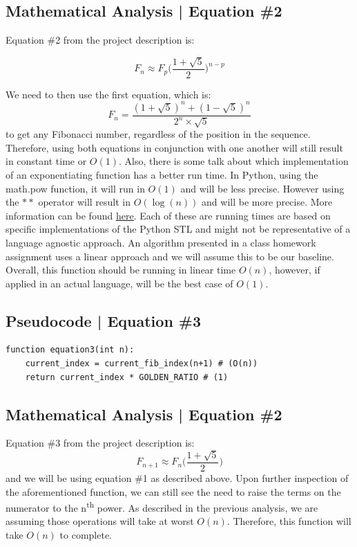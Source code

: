 \documentclass{article}
\begin{document}
\subsection{Mathematical Analysis | Equation \#2}
\begin{flushleft}
Equation \#2 from the project description is:

$$F_{n} \approx F_{p}\bigg(\frac{1 + \sqrt{5}}{2}\bigg)^{n - p}$$

We need to then use the first equation, which is:
$$ F_{n} = \frac{(1 + \sqrt{5})^{n} + (1 - \sqrt{5})^{n}}{2^{n} \times \sqrt{5}}$$
to get any Fibonacci number, regardless of the position in the sequence.
Therefore, using both equations in conjunction with one another will still result in constant time or $O(1)$.
Also, there is some talk about which implementation of an exponentiating function has a better run time.
In Python, using the math.pow function, it will run in $O(1)$ and will be less precise.
However using the $**$ operator will result in $O(\log(n))$ and will be more precise.
More information can be found \href{https://stackoverflow.com/questions/48839772/why-is-time-complexity-o1-for-powx-y-while-it-is-on-for-xy}{\underline{here}}.
Each of these are running times are based on specific implementations of the Python STL and might not be representative of a language agnostic approach.
An algorithm presented in a class homework assignment uses a linear approach and we will assume this to be our baseline.
Overall, this function should be running in linear time $O(n)$, however, if applied in an actual language, will be the best case of $O(1)$.
\end{flushleft}

\newpage

\subsection{Pseudocode | Equation \#3}

\begin{verbatim}
function equation3(int n):
    current_index = current_fib_index(n+1) # (O(n))
    return current_index * GOLDEN_RATIO # (1)

\end{verbatim}

\subsection{Mathematical Analysis | Equation \#2}
\begin{flushleft}
Equation \#3 from the project description is:
$$F_{n+1} \approx F_{n}\bigg(\frac{1 + \sqrt{5}}{2}\bigg)$$
and we will be using equation \#1 as described above.
Upon further inspection of the aforementioned function, we can still see the need to raise the terms on the numerator to the n\textsuperscript{th} power.
As described in the previous analysis, we are assuming those operations will take at worst $O(n)$.
Therefore, this function will take $O(n)$ to complete.
\end{flushleft}
\end{document}

